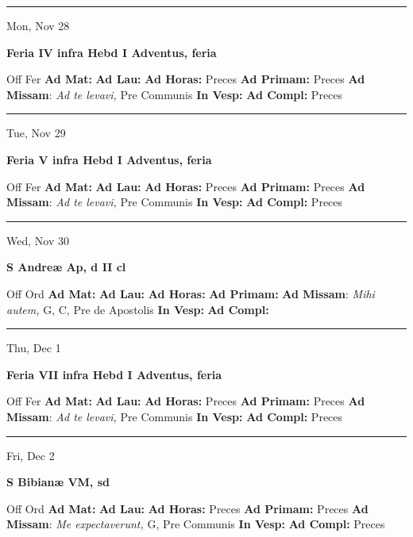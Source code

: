 \documentclass[letterpaper, 10pt]{article}
\begin{document}
\hrule
\begin{center}
Mon, Nov 28
\end{center}\textbf{ \large Feria IV infra Hebd I Adventus, \textnormal{\normalsize feria}}
\begin{justify}
Off Fer
\textbf{Ad Mat: }
\textbf{Ad Lau: }
\textbf{Ad Horas: }Preces
\textbf{Ad Primam: }Preces
\textbf{Ad Missam}: \textit{Ad te levavi,} Pre Communis
\textbf{In Vesp: }
\textbf{Ad Compl: }Preces\end{justify}



\hrule
\begin{center}
Tue, Nov 29
\end{center}\textbf{ \large Feria V infra Hebd I Adventus, \textnormal{\normalsize feria}}
\begin{justify}
Off Fer
\textbf{Ad Mat: }
\textbf{Ad Lau: }
\textbf{Ad Horas: }Preces
\textbf{Ad Primam: }Preces
\textbf{Ad Missam}: \textit{Ad te levavi,} Pre Communis
\textbf{In Vesp: }
\textbf{Ad Compl: }Preces\end{justify}



\hrule
\begin{center}
Wed, Nov 30
\end{center}\textbf{ \large S Andreæ Ap, \textnormal{\normalsize d II cl}}
\begin{justify}
Off Ord
\textbf{Ad Mat: }
\textbf{Ad Lau: }
\textbf{Ad Horas: }
\textbf{Ad Primam: }
\textbf{Ad Missam}: \textit{Mihi autem,} G, C, Pre de Apostolis
\textbf{In Vesp: }
\textbf{Ad Compl: }\end{justify}



\hrule
\begin{center}
Thu, Dec 1
\end{center}\textbf{ \large Feria VII infra Hebd I Adventus, \textnormal{\normalsize feria}}
\begin{justify}
Off Fer
\textbf{Ad Mat: }
\textbf{Ad Lau: }
\textbf{Ad Horas: }Preces
\textbf{Ad Primam: }Preces
\textbf{Ad Missam}: \textit{Ad te levavi,} Pre Communis
\textbf{In Vesp: }
\textbf{Ad Compl: }Preces\end{justify}



\hrule
\begin{center}
Fri, Dec 2
\end{center}\textbf{ \large S Bibianæ VM, \textnormal{\normalsize sd}}
\begin{justify}
Off Ord
\textbf{Ad Mat: }
\textbf{Ad Lau: }
\textbf{Ad Horas: }Preces
\textbf{Ad Primam: }Preces
\textbf{Ad Missam}: \textit{Me expectaverunt,} G, Pre Communis
\textbf{In Vesp: }
\textbf{Ad Compl: }Preces\end{justify}
\end{document}
